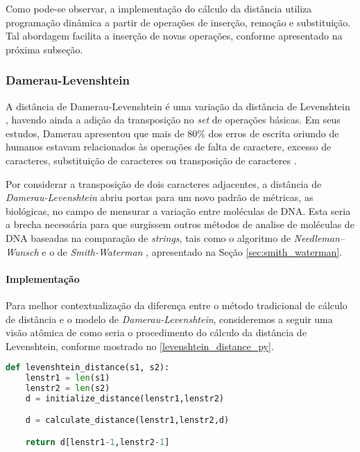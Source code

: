 Como pode-se observar, a implementação do cálculo da distância utiliza programação dinâmica a partir de operações de inserção, remoção e substituição. Tal abordagem facilita a inserção de novas operações, conforme apresentado na próxima subseção.

\subsubsection*{Damerau-Levenshtein} %
\label{sec:damerau_levenshtein}

A distância de Damerau-Levenshtein é uma variação da distância de Levenshtein \cite{levenshtein1965}, havendo ainda a adição da transposição no \textit{set} de operações básicas. Em seus estudos, Damerau apresentou que mais de $80\%$ dos erros de escrita oriundo de humanos estavam relacionados às operações de falta de caractere, excesso de caracteres, substituição de caracteres ou transposição de caracteres \cite{damerau1964technique}.


Por  considerar  a transposição de dois caracteres adjacentes, a distância de \textit{Damerau-Levenshtein} abriu portas para um novo padrão de métricas, as biológicas, no campo de mensurar a variação entre moléculas de DNA. Esta seria a brecha necessária para que surgissem outros métodos de analise de moléculas de DNA baseadas na comparação de \textit{strings}, tais como o algoritmo de \textit{Needleman–Wunsch} \cite{needleman1970general} e  o de \textit{Smith-Waterman} \cite{smith1981identification}, apresentado  na Seção \ref{sec:smith_waterman}.

\paragraph*{Implementação} %
\label{sub:implementa_damerau_levenshtein}

Para melhor contextualização da diferença entre o método tradicional de cálculo de distância e o modelo de \textit{Damerau-Levenshtein}, consideremos a seguir uma visão atômica de como seria o procedimento do cálculo da distância de Levenshtein, conforme mostrado no \autoref{levenshtein_distance_py}.

\begin{lstlisting}[language=Python,label=levenshtein_distance_py,caption={Visão atômica do cálculo da distância de Levenshtein}]
def levenshtein_distance(s1, s2):
    lenstr1 = len(s1)
    lenstr2 = len(s2)
    d = initialize_distance(lenstr1,lenstr2)

	d = calculate_distance(lenstr1,lenstr2,d) 

    return d[lenstr1-1,lenstr2-1]
\end{lstlisting}

